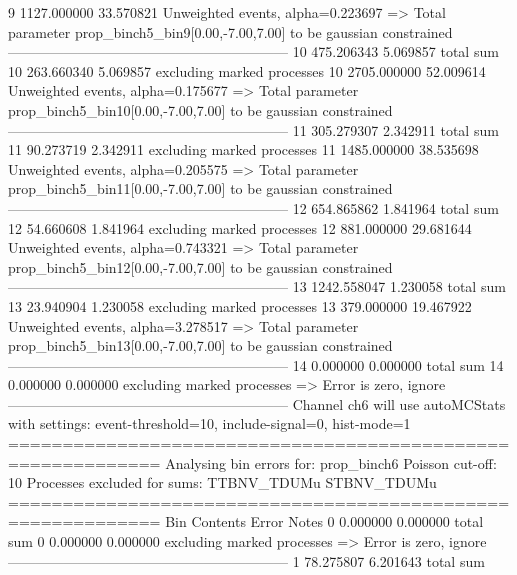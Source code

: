 9          1127.000000     33.570821       Unweighted events, alpha=0.223697
  => Total parameter prop_binch5_bin9[0.00,-7.00,7.00] to be gaussian constrained
------------------------------------------------------------
10         475.206343      5.069857        total sum                     
10         263.660340      5.069857        excluding marked processes    
10         2705.000000     52.009614       Unweighted events, alpha=0.175677
  => Total parameter prop_binch5_bin10[0.00,-7.00,7.00] to be gaussian constrained
------------------------------------------------------------
11         305.279307      2.342911        total sum                     
11         90.273719       2.342911        excluding marked processes    
11         1485.000000     38.535698       Unweighted events, alpha=0.205575
  => Total parameter prop_binch5_bin11[0.00,-7.00,7.00] to be gaussian constrained
------------------------------------------------------------
12         654.865862      1.841964        total sum                     
12         54.660608       1.841964        excluding marked processes    
12         881.000000      29.681644       Unweighted events, alpha=0.743321
  => Total parameter prop_binch5_bin12[0.00,-7.00,7.00] to be gaussian constrained
------------------------------------------------------------
13         1242.558047     1.230058        total sum                     
13         23.940904       1.230058        excluding marked processes    
13         379.000000      19.467922       Unweighted events, alpha=3.278517
  => Total parameter prop_binch5_bin13[0.00,-7.00,7.00] to be gaussian constrained
------------------------------------------------------------
14         0.000000        0.000000        total sum                     
14         0.000000        0.000000        excluding marked processes    
  => Error is zero, ignore      
------------------------------------------------------------
Channel ch6 will use autoMCStats with settings: event-threshold=10, include-signal=0, hist-mode=1
============================================================
Analysing bin errors for: prop_binch6
Poisson cut-off: 10
Processes excluded for sums: TTBNV_TDUMu STBNV_TDUMu
============================================================
Bin        Contents        Error           Notes                         
0          0.000000        0.000000        total sum                     
0          0.000000        0.000000        excluding marked processes    
  => Error is zero, ignore      
------------------------------------------------------------
1          78.275807       6.201643        total sum                     
